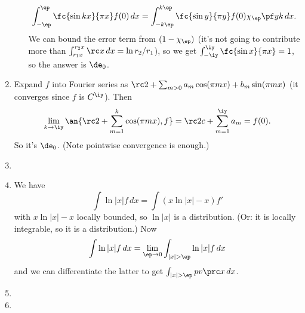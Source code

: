 \begin{enumerate}
\begin{enumerate}
\[
\int_{-\ep}^{\ep} \fc{\sin kx}{\pi x}f(0)\,dx=\int_{-k\ep}^{k\ep} \fc{\sin y}{\pi y} f(0)\chi_{\ep}\pf yk\,dx.
\]
We can bound the error term from $(1-\chi_{\ep})$ (it's not going to contribute more than $\int_{r_1x}^{r_2x}\rc x\,dx=\ln r_2/r_1$), so we get $\int_{-\iy}^{\iy}\fc{\sin x}{\pi x}=1$, so the answer is $\de_0$.
\end{enumerate}
\item Expand $f$ into Fourier series as $\rc2+\sum_{m>0} a_m\cos(\pi mx)+b_m\sin (\pi mx) $ (it converges since $f$ is $C^{\iy}$). Then 
\[
\lim_{k\to \iy} \an{\rc2+\sum_{m=1}^k \cos(\pi mx),f}=\rc2 c+\sum_{m=1}^{\iy} a_m=f(0).
\]
So it's $\de_0$.
(Note pointwise convergence is enough.)
\item 
{}
\item We have 
\[
\int\ln|x|f\,dx=\int (x\ln|x|-x)f'
\]
with $x\ln|x|-x$ locally bounded, so $\ln |x|$ is a distribution. (Or: it is locally integrable, so it is a distribution.)
Now
\[
\int \ln |x|f\,dx=\lim_{\ep\to 0}\int_{|x|>\ep}\ln |x|f\,dx
\]
and we can differentiate the latter to get $\int_{|x|>\ep}pv\prc x\,dx$.
\item 
\item
\end{enumerate}
